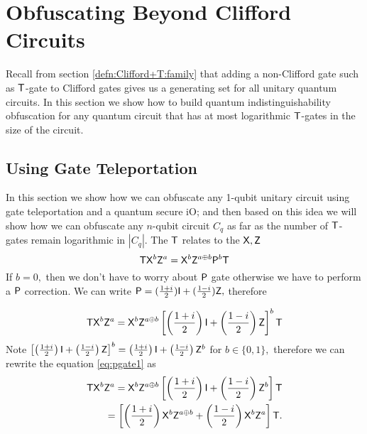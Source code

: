 
\section{Obfuscating Beyond Clifford Circuits}
\label{QiO:Clifford+T:family}
Recall from  section \ref{defn:Clifford+T:family} that adding a non-Clifford gate  such as ${\sf T}$-gate to Clifford gates gives us a generating set for all unitary quantum circuits. In this section we show how to build quantum indistinguishability obfuscation for any quantum circuit that has at most logarithmic  ${\sf T}$-gates in the size of the circuit.




\subsection{Using Gate Teleportation}
\label{QiO:Clifford+T:family+GT}
In this section we show how we can obfuscate any 1-qubit unitary circuit using gate teleportation and a quantum secure iO; and then based on this idea we will show how we can obfuscate any $n$-qubit circuit $C_q$ as far as the number of ${\sf T}$-gates remain logarithmic in $|C_q|.$ The ${\sf T}$ relates to the ${\sf X}, {\sf Z}$
$${\sf T} {\sf X}^b {\sf Z}^a={\sf X}^b {\sf Z}^{a\oplus b}{\sf P}^b {\sf T}$$
If $b=0,$ then we don't have to worry about ${\sf P}$ gate otherwise we have to perform a ${\sf P}$ correction. We can write ${\sf P}=(\frac{1+i}{2}) {\sf I} + (\frac{1-i}{2}){\sf Z},$ therefore

\begin{equation}
\label{eq:pgate1}
{\sf T} {\sf X}^b {\sf Z}^a={\sf X}^b {\sf Z}^{a\oplus b}\left[\left(\frac{1+i}{2}\right) {\sf I} + \left(\frac{1-i}{2}\right){\sf Z}\right]^b {\sf T}
\end{equation}
Note  $\left[\left(\frac{1+i}{2}\right) {\sf I} + \left(\frac{1-i}{2}\right){\sf Z}\right]^b=\left(\frac{1+i}{2}\right) {\sf I} + \left(\frac{1-i}{2}\right){\sf Z}^b$ for $b \in \{0,1\},$ therefore we can rewrite the equation \ref{eq:pgate1} as
\begin{equation}
\label{eq:pgate2}
\begin{aligned}
{\sf T} {\sf X}^b {\sf Z}^a={\sf X}^b {\sf Z}^{a\oplus b}\left[\left(\frac{1+i}{2}\right) {\sf I} + \left(\frac{1-i}{2}\right){\sf Z}^b\right] {\sf T} \\
=\left[\left(\frac{1+i}{2}\right) {\sf X}^b {\sf Z}^{a\oplus b} + \left(\frac{1-i}{2}\right){\sf X}^b {\sf Z}^a\right] {\sf T}. \\
\end{aligned}
\end{equation}

